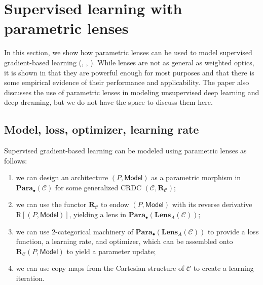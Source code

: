 \documentclass[11pt,a4paper,openright,twoside]{report}
\theoremstyle{plain}
\theoremstyle{definition}
\begin{document}
\section{Supervised learning with parametric lenses}
\label{sec: opticbasedlearning}

In this section, we show how parametric lenses can be used to model supervised gradient-based learning (\cite{cruttwell2022categorical}, \cite{gavranovic2024fundamental}, \cite{shiebler2021category}). While lenses are not as general as weighted optics, it is shown in \cite{cruttwell2022categorical} that they are powerful enough for most purposes and that there is some empirical evidence of their performance and applicability. The paper also discusses the use of parametric lenses in modeling unsupervised deep learning and deep dreaming, but we do not have the space to discuss them here.

\subsection{Model, loss, optimizer, learning rate}

Supervised gradient-based learning can be modeled using parametric lenses as follows:
\begin{enumerate}
  \item  we can design an architecture $(P,\mathsf{Model})$ as a parametric morphism in $\mathbf{Para}_{\bullet}(\mathcal{C})$ for some generalized CRDC $(\mathcal{C},\mathbf{R}_{\mathcal{C}})$;
  \item we can use the functor $\mathbf{R}_{\mathcal{C}}$ to endow $(P,\mathsf{Model})$ with its reverse derivative $\mathrm{R}[(P,\mathsf{Model})]$, yielding a lens in $\mathbf{Para}_{\bullet}(\mathbf{Lens}_A(\mathcal{C}))$;
  \item we can use $2$-categorical machinery of $\mathbf{Para}_{\bullet}(\mathbf{Lens}_A(\mathcal{C}))$ to provide a loss function, a learning rate, and optimizer, which can be assembled onto $\mathbf{R}_{\mathcal{C}}(P,\mathsf{Model})$ to yield a parameter update;
  \item we can use copy maps from the Cartesian structure of $\mathcal{C}$ to create a learning iteration.
\end{enumerate}
\end{document}
